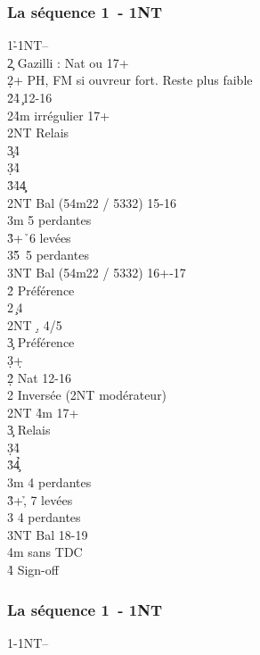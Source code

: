 \documentclass[a4paper]{article}
\begin{document}
\subsubsection{La séquence 1\pdfh\ - 1NT}

\begin{bidtable}
1\h-1NT--\\
2\c \> Gazilli : Nat ou 17+\+\\
2\d {}+ PH, FM si ouvreur fort. Reste plus faible\+\\
2\h {}\h 4\c\ 12-16\\
2\s {}\h 4m irrégulier 17+\+\\
2NT \> Relais\+\\
3\c {}\h 4\c \\
3\d {}\h 4\d \\
3\h {}\h 4\d 4\c \-\-\\
2NT \> Bal (54m22 / 5332) 15-16\\
3m  5 perdantes\\
3\h {}+\h\ 6 levées\\
3\s {}\h 5\s\ 5 perdantes\\
3NT \> Bal (54m22 / 5332) 16+-17\-\\
2\h \> Préférence\\
2\s {}\c\ 4\d \\
2NT \d , 4/5\c \\
3\c \> Préférence\\
3\d {}+\d \-\\
2\d\h \> Nat 12-16\\
2\s \> Inversée (2NT modérateur)\\
2NT \h 4m 17+\+\\
3\c \> Relais\+\\
3\d {}\h 4\d \\
3\h {}\h 4\c \-\-\\
3m  4 perdantes\\
3\h {}+\h , 7 levées\\
3\s {} 4 perdantes\\
3NT \> Bal 18-19\\
4m  sans TDC\\
4\h \> Sign-off
\end{bidtable}

\subsubsection{La séquence 1\pdfs\ - 1NT}

\begin{bidtable}
1\s-1NT--
\end{bidtable}
\end{document}
